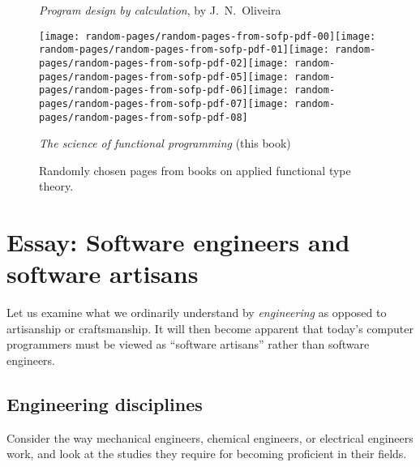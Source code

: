 \begin{figure}
\begin{centering}
\emph{Program design by calculation}, by J.~N.~Oliveira
\par\end{centering}
\begin{centering}
\vspace{1\baselineskip}
\par\end{centering}
\begin{centering}
\texttt{[image: random-pages/random-pages-from-sofp-pdf-00]}\texttt{[image: random-pages/random-pages-from-sofp-pdf-01]}\texttt{[image: random-pages/random-pages-from-sofp-pdf-02]}\texttt{[image: random-pages/random-pages-from-sofp-pdf-05]}\texttt{[image: random-pages/random-pages-from-sofp-pdf-06]}\texttt{[image: random-pages/random-pages-from-sofp-pdf-07]}\texttt{[image: random-pages/random-pages-from-sofp-pdf-08]}
\par\end{centering}
\vspace{-0.3\baselineskip}

\begin{centering}
\emph{The science of functional programming} (this book)
\par\end{centering}
\vspace{1\baselineskip}

\caption{Randomly chosen pages from books on applied functional type theory.\label{fig:Randomly-chosen-pages}}
\end{figure}


\chapter{Essay: Software engineers and software artisans}

Let us examine what we ordinarily understand by \emph{engineering}
as opposed to artisanship or craftsmanship. It will then become apparent
that today\textsf{'}s computer programmers must be viewed as \textsf{``}software artisans\textsf{''}
rather than software engineers.

\section{Engineering disciplines }

Consider the way mechanical engineers, chemical engineers, or electrical
engineers work, and look at the studies they require for becoming
proficient in their fields.

